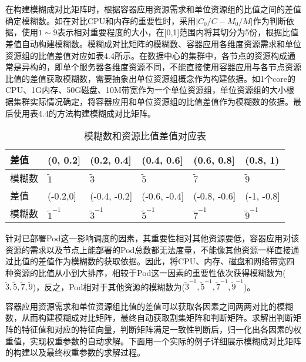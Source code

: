 在构建模糊成对比矩阵时，根据容器应用资源需求和单位资源组的比值之间的差值确定模糊数。如在对比CPU和内存的重要性时，采用$|C_{0}/C-M_{0}/M|$作为判断依据，使用$\widetilde{1}\sim\widetilde{9}$表示相对重要程度的大小，在[0,1]范围内将其切分为5份，根据比值差值自动构建模糊数。模糊成对比矩阵的模糊数、容器应用各维度资源需求和单位资源组的比值差值对应如表4.4所示。在数据中心的集群中，各节点的资源构成通常是异构的，即单个服务器各维度资源不同，不能直接使用容器应用与各节点资源比值的差值获取模糊数，需要抽象出单位资源组概念作为构建依据。如1个core的CPU、1G内存、50G磁盘、10M带宽作为一个单位资源组，单位资源组的大小根据集群实际情况确定，将容器应用和单位资源组的比值差值作为模糊数的依据。最后使用表4.4的方法构建模糊成对比矩阵。
\begin{table}[htbp]
	\centering\dawu[1.3]
	\caption{模糊数和资源比值差值对应表}
	\begin{tabular}{|p{1.8cm}<{\centering}|p{1.8cm}<{\centering}|p{1.8cm}<{\centering}|p{1.8cm}<{\centering}|p{1.8cm}<{\centering}|p{1.8cm}<{\centering}|} \hline
		差值 & (0, 0.2] & (0.2, 0.4] & (0.4, 0.6] & (0.6, 0.8] & (0.8, 1) \\ \hline
		模糊数 & $\widetilde{1}$ & $\widetilde{3}$ & $\widetilde{5}$ & $\widetilde{7}$  & $\widetilde{9}$  \\ \hline
		差值 & (-0.2,0] & (-0.4, -0.2] & (-0.6, -0.4] & (-0.8, -0.6] & (-1, -0.8]  \\ \hline
		模糊数 & $\widetilde{1}^{-1}$ & $\widetilde{3}^{-1}$ & $\widetilde{5}^{-1}$ & $\widetilde{7}^{-1}$ & $\widetilde{9}^{-1}$  \\ \hline
	\end{tabular}
\end{table}

针对已部署Pod这一影响调度的因素，其重要性相对其他资源要低，容器应用对该资源的需求以及节点上能部署的Pod总数都无法度量，不能像其他资源一样直接通过比值的差值作为模糊数的获取依据。因此，将CPU、内存、磁盘和网络带宽四种资源的比值从小到大排序，相较于Pod这一因素的重要性依次获得模糊数为(${\widetilde{3},\widetilde{5},\widetilde{7},\widetilde{9}}$)，反之，Pod相对于其他资源的模糊数为(${\widetilde{3}^{-1},\widetilde{5}^{-1},\widetilde{7}^{-1},\widetilde{9}^{-1}}$)。

容器应用资源需求和单位资源组比值的差值可以获取各因素之间两两对比的模糊数，从而构建模糊成对比矩阵，最终自动获取割集矩阵和判断矩阵。求解出判断矩阵的特征值和对应的特征向量，判断矩阵满足一致性判断后，归一化出各因素的权重值，实现权重参数的自动求解。下面用一个实际的例子详细展示模糊成对比矩阵的构建以及最终权重参数的求解过程。

